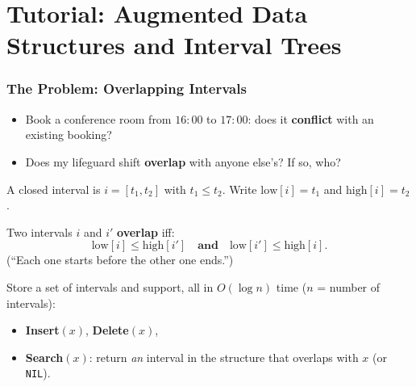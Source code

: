 \documentclass[11pt]{article}
\begin{document}
\newpage


\part*{\textcolor{utnavy}{Tutorial: Augmented Data Structures and Interval Trees}}

\section{The Problem: Overlapping Intervals}

\begin{examplebox}[Applications]
\begin{itemize}[leftmargin=1.4em,itemsep=1pt]
  \item Book a conference room from $16{:}00$ to $17{:}00$: does it \textbf{conflict} with an existing booking?
  \item Does my lifeguard shift \textbf{overlap} with anyone else's? If so, who?
\end{itemize}
\end{examplebox}

\begin{defbox}
A closed interval is $i = [t_1, t_2]$ with $t_1 \le t_2$. Write $\text{low}[i] = t_1$ and $\text{high}[i] = t_2$.

Two intervals $i$ and $i'$ \textbf{overlap} iff:
\[
  \text{low}[i] \le \text{high}[i'] \quad\textbf{and}\quad \text{low}[i'] \le \text{high}[i].
\]
(``Each one starts before the other one ends.'')
\end{defbox}

\begin{defbox}[\textcolor{defblue}{Goal}]
Store a set of intervals and support, all in \textcolor{greenO}{$O(\log n)$} time ($n$ = number of intervals):
\begin{itemize}[leftmargin=1.4em,itemsep=1pt]
  \item \textbf{Insert}$(x)$, \textbf{Delete}$(x)$,
  \item \textbf{Search}$(x)$: return \emph{an} interval in the structure that overlaps with $x$ (or \texttt{NIL}).
\end{itemize}
\end{defbox}
\end{document}
